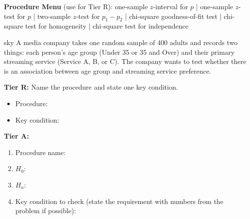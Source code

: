 \documentclass[10pt]{article}
\begin{document}
\namepartnerperiod

\vspace{0.08in}

\textbf{Procedure Menu} (use for Tier R): one-sample $z$-interval for $p$ \;|\;
one-sample $z$-test for $p$ \;|\; two-sample $z$-test for $p_1-p_2$ \;|\;
chi-square goodness-of-fit test \;|\;
chi-square test for homogeneity \;|\;
chi-square test for independence

\vspace{0.06in}

\begin{scenariobox}{sky}
A media company takes one random sample of 400 adults and records two things: each person's
age group (Under 35 or 35 and Over) and their primary streaming service (Service A, B, or C).
The company wants to test whether there is an association between age group and streaming
service preference.

\textbf{Tier R:} Name the procedure and state one key condition.
\begin{itemize}
  \item Procedure: 
  \item Key condition: 
\end{itemize}

\textbf{Tier A:}
\begin{enumerate}
  \item Procedure name: 
  \item $H_0$: 
  \item $H_a$: 
  \item Key condition to check (state the requirement with numbers from the problem if possible):
\end{enumerate}
\end{scenariobox}
\end{document}

